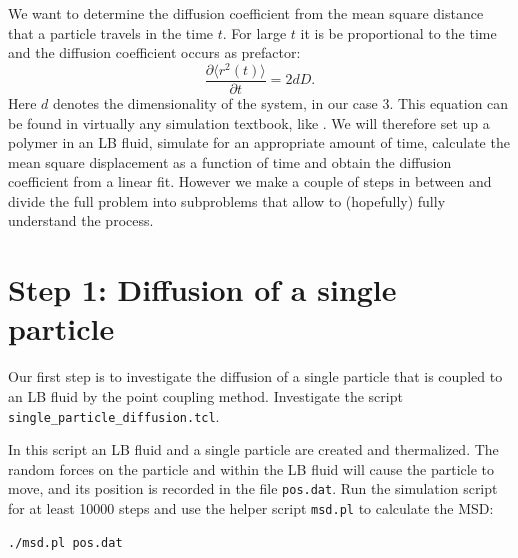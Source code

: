 We want to determine the diffusion coefficient from the mean square
distance that a particle travels in the time $t$. For large $t$ it is
be proportional to the time and the diffusion coefficient occurs as 
prefactor: 
\begin{equation}
  \frac{\partial \langle r^2 \left(t\right)\rangle}{\partial t} = 2 d D. 
  \label{eq:msd}
\end{equation}
Here $d$ denotes the dimensionality of the system, in our case 3.
This equation can be found in virtually any simulation textbook, like
\cite{frenkel02b}.
We will therefore set up a polymer in an LB fluid, simulate for an appropriate
amount of time, calculate the mean square displacement as a function of
time and obtain the diffusion coefficient from a linear fit. However
we make a couple of steps in between and divide the full problem into 
subproblems that allow to (hopefully) fully understand the process.

\section{Step 1: Diffusion of a single particle}
Our first step is to investigate the diffusion of a single particle
that is coupled to an LB fluid by the point coupling method.
Investigate the script  \lstinline|single_particle_diffusion.tcl|.

In this script an LB fluid and a single particle are created and
thermalized.
The random forces on the particle and
within the LB fluid will cause the particle to move, and its position
is recorded in the file  \lstinline|pos.dat|. 
Run the simulation script for at least 10000 steps
and use the helper script  \lstinline|msd.pl| to calculate the MSD: 
{\vspace{0,2cm}\small
\begin{lstlisting}[numbers=none]
./msd.pl pos.dat
\end{lstlisting}\vspace{0,2cm}
}

